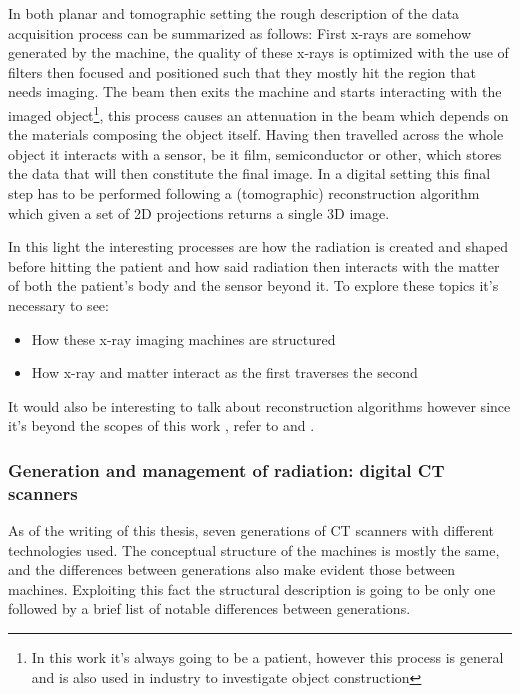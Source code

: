 In both planar and tomographic setting the rough description of the data acquisition process can be summarized as follows: First x-rays are somehow generated by the machine, the quality of these x-rays is optimized with the use of filters then focused and positioned such that they mostly hit the region that needs imaging. The beam then exits the machine and starts interacting with the imaged object\footnote{In this work it's always going to be a patient, however this process is general and is also used in industry to investigate object construction}, this process causes an attenuation in the beam which depends on the materials composing the object itself. Having then travelled across the whole object it interacts with a sensor, be it film, semiconductor or other, which stores the data that will then constitute the final image. In a digital setting this final step has to be performed following a (tomographic) reconstruction algorithm which given a set of 2D projections returns a single 3D image.

In this light the interesting processes are how the radiation is created and shaped before hitting the patient and how said radiation then interacts with the matter of both the patient's body and the sensor beyond it. To explore these topics it's necessary to see:

\begin{itemize}
\item How these x-ray imaging machines are structured
\item How x-ray and matter interact as the first traverses the second
\end{itemize}

It would also be interesting to talk about reconstruction algorithms however since it's beyond the scopes of this work , refer to \cite{xray_reconstruction} and \cite{PhysicsMedicalImaging}.

\subsubsection{Generation and management of radiation: digital CT scanners}

As of the writing of this thesis, seven generations of CT scanners with different technologies used. The conceptual structure of the machines is mostly the same, and the differences between generations also make evident those between machines. Exploiting this fact the structural description is going to be only one followed by a brief list of notable differences between generations.

